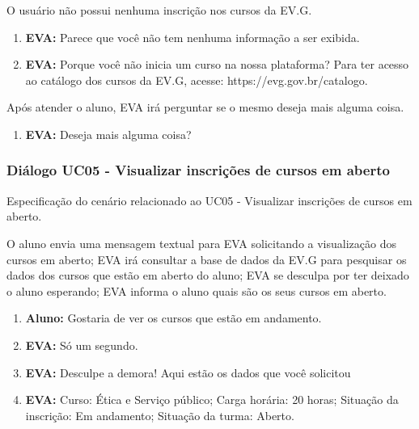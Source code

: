     
O usuário não possui nenhuma inscrição nos cursos da EV.G.
        
\begin{enumerate}[label=\alph*)]
        \tightlist
    \item \textbf{EVA:} Parece que você não tem nenhuma informação a ser exibida.
    \item \textbf{EVA:} Porque você não inicia um curso na nossa plataforma? Para ter acesso ao catálogo dos cursos da EV.G, acesse: https://evg.gov.br/catalogo.
\end{enumerate}
    
    
Após atender o aluno, EVA irá perguntar se o mesmo deseja mais alguma coisa.
        
\begin{enumerate}[label=\alph*)]
        \tightlist
    \item \textbf{EVA:} Deseja mais alguma coisa?
\end{enumerate}


\subsubsection{Diálogo UC05 - Visualizar inscrições de cursos em aberto}

Especificação do cenário relacionado ao UC05 - Visualizar inscrições de cursos em aberto.

    
O aluno envia uma mensagem textual para EVA solicitando a visualização dos cursos em aberto; EVA irá consultar a base de dados da EV.G para pesquisar os dados dos cursos que estão em aberto do aluno; EVA se desculpa por ter deixado o aluno esperando; EVA informa o aluno quais são os seus cursos em aberto.
        
\begin{enumerate}[label=\alph*)]
        \tightlist
    \item \textbf{Aluno:} Gostaria de ver os cursos que estão em andamento.
    \item \textbf{EVA:} Só um segundo.
    \item \textbf{EVA:} Desculpe a demora! Aqui estão os dados que você solicitou
    \item \textbf{EVA:} Curso: Ética e Serviço público; Carga horária: 20 horas; Situação da inscrição: Em andamento; Situação da turma: Aberto.
\end{enumerate}
    
